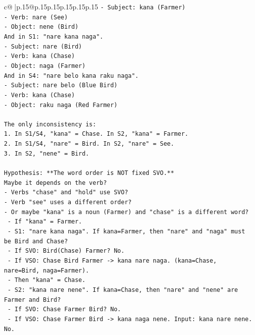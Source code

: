 \documentclass{article}
\begin{document}
{\begin{supertabular}{c@{$\;$}|p{.15\linewidth}@{}p{.15\linewidth}p{.15\linewidth}p{.15\linewidth}p{.15\linewidth}p{.15\linewidth}}
{{{\texttt{{-} Subject: kana (Farmer)} \\
\texttt{{-} Verb: nare (See)} \\
\texttt{{-} Object: nene (Bird)} \\
\texttt{And in S1: "nare kana naga".} \\
\texttt{{-} Subject: nare (Bird)} \\
\texttt{{-} Verb: kana (Chase)} \\
\texttt{{-} Object: naga (Farmer)} \\
\texttt{And in S4: "nare belo kana raku naga".} \\
\texttt{{-} Subject: nare belo (Blue Bird)} \\
\texttt{{-} Verb: kana (Chase)} \\
\texttt{{-} Object: raku naga (Red Farmer)} \\
\\ 
\texttt{The only inconsistency is:} \\
\texttt{1. In S1/S4, "kana" = Chase. In S2, "kana" = Farmer.} \\
\texttt{2. In S1/S4, "nare" = Bird. In S2, "nare" = See.} \\
\texttt{3. In S2, "nene" = Bird.} \\
\\ 
\texttt{Hypothesis: **The word order is NOT fixed SVO.**} \\
\texttt{Maybe it depends on the verb?} \\
\texttt{{-} Verbs "chase" and "hold" use SVO?} \\
\texttt{{-} Verb "see" uses a different order?} \\
\texttt{{-} Or maybe "kana" is a noun (Farmer) and "chase" is a different word?} \\
\texttt{  {-} If "kana" = Farmer.} \\
\texttt{  {-} S1: "nare kana naga". If kana=Farmer, then "nare" and "naga" must be Bird and Chase?} \\
\texttt{    {-} If SVO: Bird(Chase) Farmer? No.} \\
\texttt{    {-} If VSO: Chase Bird Farmer {-}> kana nare naga. (kana=Chase, nare=Bird, naga=Farmer).} \\
\texttt{      {-} Then "kana" = Chase.} \\
\texttt{      {-} S2: "kana nare nene". If kana=Chase, then "nare" and "nene" are Farmer and Bird?} \\
\texttt{        {-} If SVO: Chase Farmer Bird? No.} \\
\texttt{        {-} If VSO: Chase Farmer Bird {-}> kana naga nene. Input: kana nare nene. No.} \\
}}}
\end{supertabular}}
\end{document}
